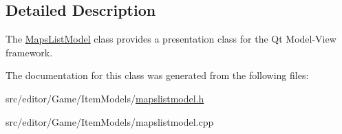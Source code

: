 \subsection{\-Detailed \-Description}
\-The \hyperlink{class_maps_list_model}{\-Maps\-List\-Model} class provides a presentation class for the \-Qt \-Model-\/\-View framework. 

\-The documentation for this class was generated from the following files\-:\begin{DoxyCompactItemize}
\item 
src/editor/\-Game/\-Item\-Models/\hyperlink{mapslistmodel_8h}{mapslistmodel.\-h}\item 
src/editor/\-Game/\-Item\-Models/mapslistmodel.\-cpp\end{DoxyCompactItemize}
